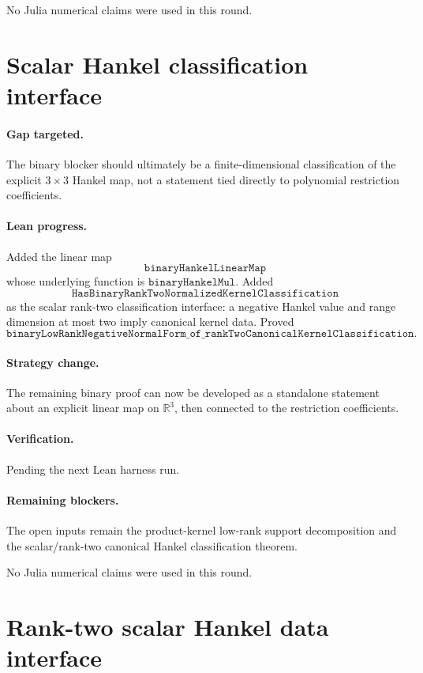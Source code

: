 \documentclass[11pt]{article}
\begin{document}
No Julia numerical claims were used in this round.

\section*{Scalar Hankel classification interface}

\paragraph{Gap targeted.}
The binary blocker should ultimately be a finite-dimensional classification of
the explicit \(3\times3\) Hankel map, not a statement tied directly to
polynomial restriction coefficients.

\paragraph{Lean progress.}
Added the linear map
\[
\texttt{binaryHankelLinearMap}
\]
whose underlying function is \(\texttt{binaryHankelMul}\).  Added
\[
\texttt{HasBinaryRankTwoNormalizedKernelClassification}
\]
as the scalar rank-two classification interface:
a negative Hankel value and range dimension at most two imply canonical kernel
data.  Proved
\[
\texttt{binaryLowRankNegativeNormalForm\_of\_rankTwoCanonicalKernelClassification}.
\]

\paragraph{Strategy change.}
The remaining binary proof can now be developed as a standalone statement
about an explicit linear map on \(\mathbb{R}^3\), then connected to the
restriction coefficients.

\paragraph{Verification.}
Pending the next Lean harness run.

\paragraph{Remaining blockers.}
The open inputs remain the product-kernel low-rank support decomposition and
the scalar/rank-two canonical Hankel classification theorem.

No Julia numerical claims were used in this round.

\section*{Rank-two scalar Hankel data interface}
\end{document}
